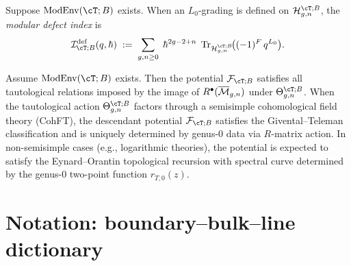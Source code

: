 \begin{definition}
\label{def:defect-index}
Suppose $\ModEnv(\cT;B)$ exists. When an $L_0$-grading is defined on
$\mathcal{H}_{g,n}^{\cT;B}$, the \emph{modular defect index} is
\[
\mathcal{I}_{\cT;B}^{\mathrm{def}}(q,\hbar)
\;:=\;
\sum_{g,n\ge 0}\;
\hbar^{2g-2+n}\;
\Tr_{\mathcal{H}_{g,n}^{\cT;B}}\!\bigl((-1)^F\,q^{L_0}\bigr).
\]
\end{definition}

\begin{conjecture}
\label{conj:taut-recursion}
Assume $\ModEnv(\cT;B)$ exists. Then the potential $\mathcal{F}_{\cT;B}$ satisfies all tautological
relations imposed by the image of
$R^{\bullet}(\overline{\mathcal M}_{g,n})$ under
$\Theta_{g,n}^{\cT;B}$. When the tautological action $\Theta_{g,n}^{\cT;B}$ factors through a
semisimple cohomological field theory (CohFT), the descendant potential
$\mathcal{F}_{\cT;B}$ satisfies the Givental--Teleman classification and is
uniquely determined by genus-$0$ data via $R$-matrix action. In
non-semisimple cases (e.g., logarithmic theories), the potential is expected
to satisfy the Eynard--Orantin topological recursion with spectral curve
determined by the genus-$0$ two-point function $r_{T,0}(z)$.
\end{conjecture}


\section{Notation: boundary--bulk--line dictionary}


